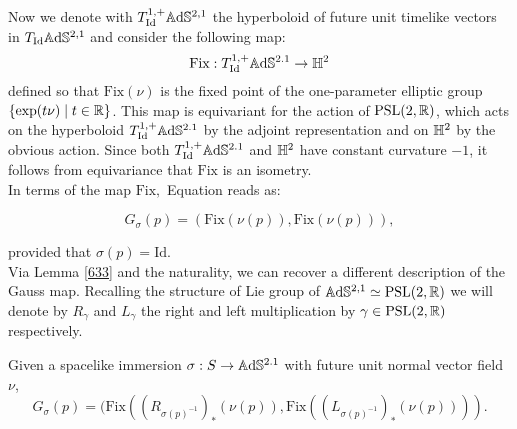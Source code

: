     Now we denote with $T_{\text{Id}}^{1,+}\mathbb{A}\mathrm{d}\mathbb{S}^{2,1}$ the hyperboloid of future unit timelike vectors in $T_{\text{Id}}\mathbb{A}\mathrm{d}\mathbb{S}^{2,1}$ and consider the following map: 
    \[
        \text{Fix}:T_{\text{Id}}^{1,+}\mathbb{A}\mathrm{d}\mathbb{S}^{2.1}\to\mathbb{H}^2
    \]
    defined so that $\text{Fix}(\nu)$ is the fixed point of the one-parameter elliptic group $\{\exp(t\nu)\;|\;t\in\mathbb{R}\}$. This map is equivariant for the action of $\text{PSL}(2,\mathbb{R})$, which acts on the hyperboloid $T_{\text{Id}}^{1,+}\mathbb{A}\mathrm{d}\mathbb{S}^{2.1}$ by the adjoint representation and on $\mathbb{H}^2$ by the obvious action. Since both $T_{\text{Id}}^{1,+}\mathbb{A}\mathrm{d}\mathbb{S}^{2.1}$ and $\mathbb{H}^2$ have constant curvature $-1$, it follows from equivariance that $\text{Fix}$ is an isometry.  \\
    In terms of the map $\text{Fix},$ Equation  reads as: 

    \begin{equation}\label{66}
        G_\sigma(p)=(\text{Fix}(\nu(p)),\text{Fix}(\nu(p))),
    \end{equation}

    provided that $\sigma(p)=\text{Id}.$\\ Via Lemma \ref{633} and the naturality, we can recover a different description of the Gauss map. Recalling the structure of Lie group of $\mathbb{A}\mathrm{d}\mathbb{S}^{2,1}\simeq\text{PSL}(2,\mathbb{R})$ we will denote by $R_{\gamma } $ and $L_{\gamma} $ the right and left multiplication by $\gamma\in\text{PSL}(2,\mathbb{R})$ respectively. 

    \begin{lemma}
        Given a spacelike immersion $\sigma: S\to \mathbb{A}\mathrm{d}\mathbb{S}^{2.1}$ with future unit normal vector field $\nu$,
        \[
            G_\sigma(p)=(\text{Fix}((R_{\sigma(p)^{-1}})_* (\nu(p)),\text{Fix}((L_{\sigma(p)^{-1}})_* (\nu(p)))).
     \]
    \end{lemma}

